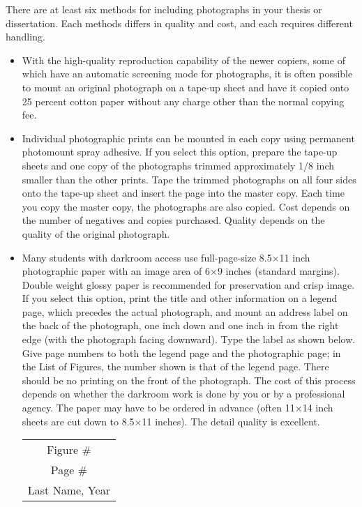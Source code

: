There are at least six methods for including photographs in your
thesis or dissertation. Each methods differs in quality and cost, and
each requires different handling.
\begin{itemize}
\item With the high-quality reproduction capability of the newer
  copiers, some of which have an automatic screening mode for
  photographs, it is often possible to mount an original photograph on
  a tape-up sheet and have it copied onto 25 percent cotton paper
  without any charge other than the normal copying fee.
\item Individual photographic prints can be mounted in each copy using
  permanent photomount spray adhesive. If you select this option,
  prepare the tape-up sheets and one copy of the photographs trimmed
  approximately 1/8 inch smaller than the other prints. Tape the
  trimmed photographs on all four sides onto the tape-up sheet and
  insert the page into the master copy. Each time you copy the master
  copy, the photographs are also copied. Cost depends on the number of
  negatives and copies purchased. Quality depends on the quality of
  the original photograph.
\item Many students with darkroom access use full-page-size 8.5$\times$11
  inch photographic paper with an image area of 6$\times$9 inches
  (standard margins). Double weight glossy paper is
  recommended for preservation and crisp image. If you select this
  option, print the title and other information on a legend page,
  which precedes the actual photograph, and mount an address label on
  the back of the photograph, one inch down and one inch in from the
  right edge (with the photograph facing downward). Type the label as
  shown below. Give page numbers to both the legend page and the
  photographic page; in the List of Figures, the number shown is that
  of the legend page.  There should be no printing on the front of the
  photograph. The cost of this process depends on whether the darkroom
  work is done by you or by a professional agency. The paper may have
  to be ordered in advance (often 11$\times$14 inch sheets are cut
  down to 8.5$\times$11 inches). The detail quality is excellent.
  \begin{center}
    \begin{tabular}[h]{|c|} \hline
      Figure \# \\
      Page \# \\
      Last Name, Year \\ \hline
    \end{tabular}

\end{center}
\end{itemize}
